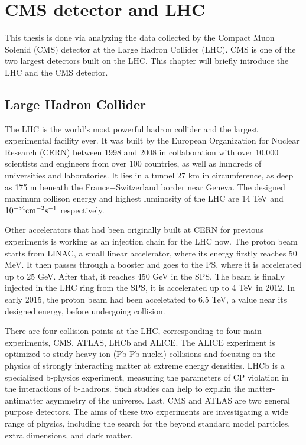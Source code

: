 \chapter{CMS detector and LHC}
This thesis is done via analyzing the data collected by the Compact Muon Solenid (CMS) detector at the Large Hadron Collider (LHC). CMS is one of the two largest detectors built on the LHC. This chapter will briefly introduce the LHC and the CMS detector.

\section{Large Hadron Collider}
The LHC is the world's most powerful hadron collider and the largest experimental facility ever. It was built by the European Organization for Nuclear Research (CERN) between 1998 and 2008 in collaboration with over 10,000 scientists and engineers from over 100 countries, as well as hundreds of universities and laboratories. It lies in a tunnel 27 km in circumference, as deep as 175 m beneath the France$-$Switzerland border near Geneva. The designed maximum collison energy and highest luminosity of the LHC are 14 TeV and $\textup{10}^{-34} \textup{cm}^{-2}\textup{s}^{-1}$ respectively.

Other accelerators that had been originally built at CERN for previous experiments is working as an injection chain for the LHC now. The proton beam starts from LINAC, a small linear accelerator, where its energy firstly reaches 50 MeV. It then passes through a booster and goes to the PS, where it is accelerated up to 25 GeV. After that, it reaches 450 GeV in the SPS. The beam is finally injected in the LHC ring from the SPS, it is accelerated up to 4 TeV in 2012. In early 2015, the proton beam had been acceletated to 6.5 TeV, a value near its designed energy, before undergoing collision.

There are four collision points at the LHC, corresponding to four main experiments, CMS, ATLAS, LHCb and ALICE. The ALICE experiment is optimized to study heavy-ion (Pb-Pb nuclei) collisions and focusing on the physics of strongly interacting matter at extreme energy densities. LHCb is a specialized b-physics experiment, measuring the parameters of CP violation in the interactions of b-hadrons. Such studies can help to explain the matter-antimatter asymmetry of the universe. Last, CMS and ATLAS are two general purpose detectors. The aims of these two experiments are investigating a wide range of physics, including the search for the beyond standard model particles, extra dimensions, and dark matter.


